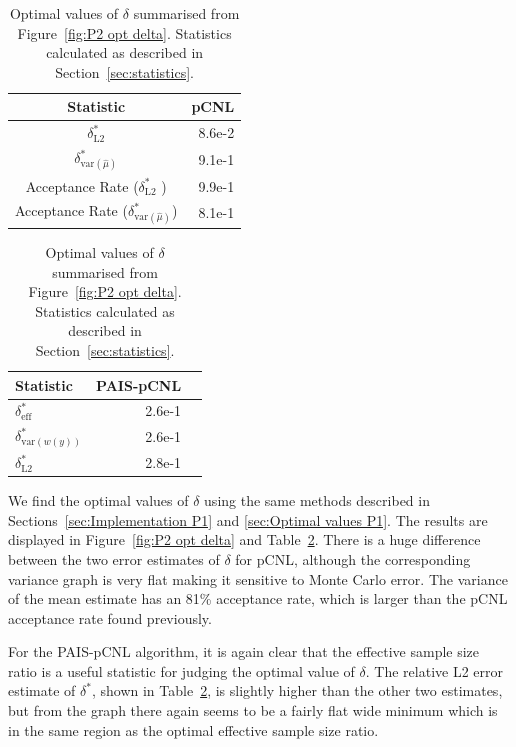\documentclass[final]{siamltex}
\begin{document}
\begin{table}[!htb]
    \begin{minipage}{.5\linewidth}
      \centering
        \begin{tabular}{|c|r|}
	\hline
	Statistic											& pCNL \\ \hline
	$\delta_{\text{L2}}^*$								& 8.6e-2 \\
	$\delta_{\text{var}(\hat{\mu})}^*$					& 9.1e-1 \\
	Acceptance Rate ($\delta_{\text{L2}}^*$	)			& 9.9e-1 \\
	Acceptance Rate ($\delta_{\text{var}(\hat{\mu})}^*$)	& 8.1e-1 \\
	\hline
	\end{tabular}
    \end{minipage}%
    \begin{minipage}{.5\linewidth}
      \centering
        \begin{tabular}{|l|r|r|}
	\hline
	Statistic							& PAIS-pCNL \\ \hline
	$\delta_{\text{eff}}^*$				& 2.6e-1 \\
	$\delta_{\text{var}(w(y))}^*$		& 2.6e-1 \\
	$\delta_{\text{L2}}^*$				& 2.8e-1 \\
	\hline
	\end{tabular}
    \end{minipage}
	\caption{Optimal values of $\delta$ summarised from Figure~\ref{fig:P2 opt delta}. Statistics calculated as described in Section~\ref{sec:statistics}.}
	\label{table:P2 opt delta}
\end{table}

We find the optimal values of $\delta$ using the same methods described in Sections~\ref{sec:Implementation P1} and \ref{sec:Optimal values P1}. The results are displayed in Figure~\ref{fig:P2 opt delta} and Table~\ref{table:P2 opt delta}. There is a huge difference between the two error estimates of $\delta$ for pCNL, although the corresponding variance graph is very flat making it sensitive to Monte Carlo error. The variance of the mean estimate has an 81\% acceptance rate, which is larger than the pCNL acceptance rate found previously.

For the PAIS-pCNL algorithm, it is again clear that the effective sample size ratio is a useful statistic for judging the optimal value of $\delta$. The relative L2 error estimate of $\delta^*$, shown in Table~\ref{table:P2 opt delta}, is slightly higher than the other two estimates, but from the graph there again seems to be a fairly flat wide minimum which is in the same region as the optimal effective sample size ratio.
\end{document}
